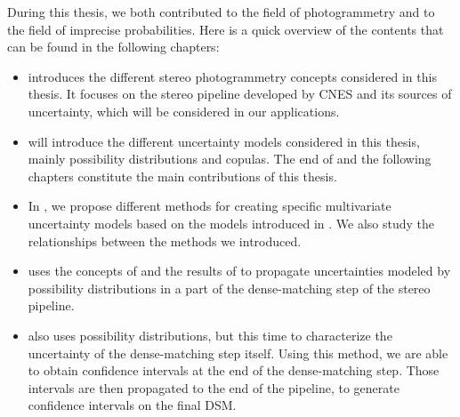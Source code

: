 During this thesis, we both contributed to the field of photogrammetry and to the field of imprecise probabilities. Here is a quick overview of the contents that can be found in the following chapters:
\begin{itemize}
    \item {} introduces the different stereo photogrammetry concepts considered in this thesis. It focuses on the stereo pipeline developed by CNES and its sources of uncertainty, which will be considered in our applications.
    \item {} will introduce the different uncertainty models considered in this thesis, mainly possibility distributions and copulas. The end of  and the following chapters constitute the main contributions of this thesis.
    \item In , we propose different methods for creating specific multivariate uncertainty models based on the models introduced in . We also study the relationships between the methods we introduced.
    \item {} uses the concepts of  and the results of  to propagate uncertainties modeled by possibility distributions in a part of the dense-matching step of the stereo pipeline.
    \item {} also uses possibility distributions, but this time to characterize the uncertainty of the dense-matching step itself. Using this method, we are able to obtain confidence intervals at the end of the dense-matching step. Those intervals are then propagated to the end of the pipeline, to generate confidence intervals on the final DSM.
\end{itemize}

